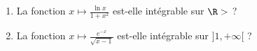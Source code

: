 \begin{enonce}
\begin{exercise}[ID={RMS121-2 E1058 (CCP)},subtitle={},tags={}]
\begin{enumerate}
\item La fonction $x\mapsto \frac{\ln x}{1+x^2}$ est-elle intégrable sur $\R>$ ?
\item La fonction $x\mapsto\frac{e^{-x}}{\sqrt{x-1}}$ est-elle intégrable sur $]1,+\infty[$ ?
\end{enumerate}
\end{exercise}
\begin{solution}
\end{solution}
\end{enonce}
